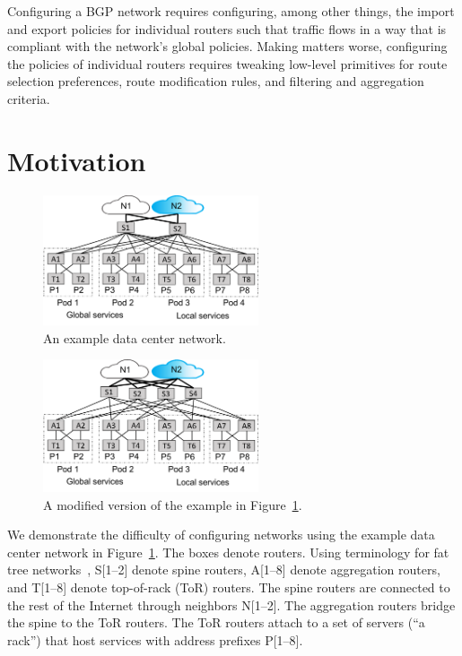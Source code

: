 \documentclass[numbers, 10pt, preprint]{sigplanconf}
\begin{document}
Configuring a BGP network requires configuring, among other things, the import and export policies for individual routers such that traffic flows in a way that is compliant with the network's global policies. Making matters worse, configuring the policies of individual routers requires tweaking low-level primitives for route selection preferences, route modification rules, and filtering and aggregation criteria.

\section{Motivation}
\label{sec:motivation}


\begin{figure}[t!]
  \centering
  \includegraphics[width=2.5in]{figures/example}
  \caption{An example data center network.}
  \label{fig:example}
  \vspace{-1em}
\end{figure}

\begin{figure}[t!]
  \centering
  \includegraphics[width=2.5in]{figures/example2}
  \caption{A modified version of the example in Figure~\ref{fig:example}.}
  \label{fig:example2}
  \vspace{-1em}
\end{figure}

We demonstrate the difficulty of configuring networks using the example data center network in Figure~\ref{fig:example}. The boxes denote routers. Using terminology for fat tree networks~\cite{fattree}, S[1--2] denote spine routers, A[1--8] denote aggregation routers, and T[1--8] denote top-of-rack (ToR) routers. The spine routers are connected to the
rest of the Internet through neighbors N[1--2]. The aggregation routers
bridge the spine to the ToR routers. The ToR routers attach to a set of servers (``a rack'') that host services with address prefixes P[1--8].
\end{document}
